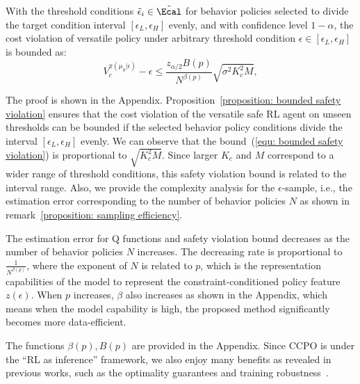 \begin{Proposition}
\label{proposition: bounded safety violation}
With the threshold conditions $\tilde{\epsilon}_i \in \tilde{\Ecal}$ for behavior policies selected to divide the target condition interval $[\epsilon_L, \epsilon_H]$ evenly, and with confidence level $1-\alpha$, the cost violation of versatile policy under arbitrary threshold condition $\epsilon \in [\epsilon_L, \epsilon_H]$ is bounded as:
\begin{equation}
\label{equ: bounded safety violation}
  V_c^{\pi(\mu_0|\epsilon)} - \epsilon \leq  \frac{z_{\alpha/2} B(p)}{N^{\beta(p)}}  \sqrt{ \sigma^2 K_c^2 M },
\end{equation}
\end{Proposition}
The proof is shown in the Appendix. Proposition~\ref{proposition: bounded safety violation} ensures that the cost violation of the versatile safe RL agent on unseen thresholds can be bounded if the selected behavior policy conditions divide the interval $[\epsilon_L, \epsilon_H]$ evenly. We can observe that the bound~(\ref{equ: bounded safety violation}) is proportional to $\sqrt{K_c^2 M}$. Since larger $K_c$ and $M$ correspond to a wider range of threshold conditions, this safety violation bound is related to the interval range.
Also, we provide the complexity analysis for the $\epsilon$-sample, i.e., the estimation error corresponding to the number of behavior policies $N$ as shown in remark~\ref{proposition: sampling efficiency}.
\begin{Remark}
\label{proposition: sampling efficiency}
The estimation error for Q functions and safety violation bound decreases as the number of behavior policies $N$ increases. The decreasing rate is proportional to $\frac{1}{N^{\beta(p)}}$, where the exponent of $N$ is related to $p$, which is the representation capabilities of the model to represent the constraint-conditioned policy feature $z(\epsilon)$. When $p$ increases, $\beta$ also increases as shown in the Appendix, which means when the model capability is high, the proposed method significantly becomes more data-efficient.
\end{Remark}
The functions $\beta(p), B(p)$ are provided in the Appendix. 
Since CCPO is under the ``RL as inference'' framework, we also enjoy many benefits as revealed in previous works, such as the optimality guarantees and training robustness~\cite{liu2022constrained}.
